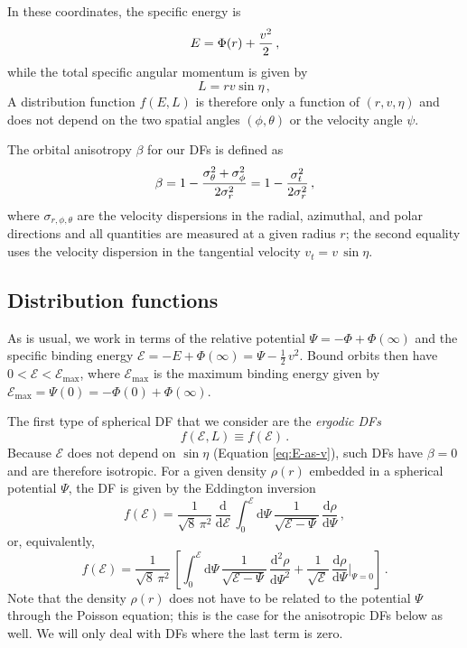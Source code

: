 In these coordinates, the specific energy is
\begin{equation}\label{eq:E-as-v}
    E = \Phi(r) + {v^2 \over 2}\,,
\end{equation}
while the total specific angular momentum is given by
\begin{equation}
    L = rv\sin \eta\,,
\end{equation}
A distribution function $f(E,L)$ is therefore only a function of $(r,v,\eta)$ and does not depend on the two spatial angles $(\phi,\theta)$ or the velocity angle $\psi$.

The orbital anisotropy $\beta$ for our DFs is defined as
\begin{equation}
    \beta = 1-{\sigma_\theta^2+\sigma_\phi^2 \over 2\sigma_r^2} = 1-{\sigma_t^2 \over 2\sigma_r^2}\,,
\end{equation}
where $\sigma_{r,\phi,\theta}$ are the velocity dispersions in the radial, azimuthal, and polar directions and all quantities are measured at a given radius $r$; the second equality uses the velocity dispersion in the tangential velocity $v_t = v\,\sin\eta$.

\subsection{Distribution functions}

As is usual, we work in terms of the relative potential $\Psi = -\Phi+\Phi(\infty)$ and the specific binding energy $\mathcal{E} =  -E +\Phi(\infty) = \Psi -\frac{1}{2}\,v^2$. Bound orbits then have $0 < \mathcal{E} < \mathcal{E}_{\mathrm{max}}$, where $\mathcal{E}_{\mathrm{max}}$ is the maximum binding energy given by $\mathcal{E}_{\mathrm{max}} = \Psi(0) = -\Phi(0)+\Phi(\infty)$.

The first type of spherical DF that we consider are the \emph{ergodic DFs}
\begin{equation}
    f(\mathcal{E},L) \equiv f(\mathcal{E})\,.
\end{equation}
Because $\mathcal{E}$ does not depend on $\sin\eta$ (Equation \ref{eq:E-as-v}), such DFs have $\beta=0$ and are therefore isotropic. For a given density $\rho(r)$ embedded in a spherical potential $\Psi$, the DF is given by the Eddington inversion \citep{Eddington16a}
\begin{equation}\label{eq-eddington-alt}
    f(\mathcal{E}) = \frac{1}{\sqrt{8}\,\pi^2}\,\frac{\mathrm{d}}{\mathrm{d}\mathcal{E}}\,\int_0^\mathcal{E}\mathrm{d}\Psi\,\frac{1}{\sqrt{\mathcal{E}-\Psi}}\,\frac{\mathrm{d}\rho}{\mathrm{d}\Psi}\,,
\end{equation}
or, equivalently,
\begin{equation}\label{eq-eddington}
    f(\mathcal{E}) = \frac{1}{\sqrt{8}\,\pi^2}\,\left[\int_0^\mathcal{E}\mathrm{d}\Psi\,\frac{1}{\sqrt{\mathcal{E}-\Psi}}\,\frac{\mathrm{d}^2\rho}{\mathrm{d}\Psi^2} +\frac{1}{\sqrt{\mathcal{E}}}\,\frac{\mathrm{d}\rho}{\mathrm{d}\Psi}\Bigg|_{\Psi=0}\right]\,.
\end{equation}
Note that the density $\rho(r)$ does not have to be related to the potential $\Psi$ through the Poisson equation; this is the case for the anisotropic DFs below as well. We will only deal with DFs where the last term is zero.

